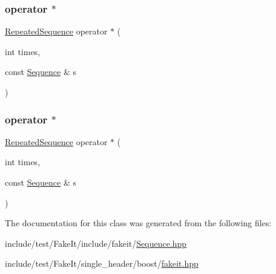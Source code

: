 \subsubsection{\texorpdfstring{operator $\ast$}{operator *}\hspace{0.1cm}{\footnotesize\ttfamily [17/18]}}
{\footnotesize\ttfamily \mbox{\hyperlink{classfakeit_1_1RepeatedSequence}{Repeated\+Sequence}} operator $\ast$ (\begin{DoxyParamCaption}\item[{int}]{times,  }\item[{const \mbox{\hyperlink{classfakeit_1_1Sequence}{Sequence}} \&}]{s }\end{DoxyParamCaption})\hspace{0.3cm}{\ttfamily [friend]}}

\mbox{\label{classfakeit_1_1RepeatedSequence_ae695b1e2c0f00bc6b9a49dd1efcb8f7b}} 
\subsubsection{\texorpdfstring{operator $\ast$}{operator *}\hspace{0.1cm}{\footnotesize\ttfamily [18/18]}}
{\footnotesize\ttfamily \mbox{\hyperlink{classfakeit_1_1RepeatedSequence}{Repeated\+Sequence}} operator $\ast$ (\begin{DoxyParamCaption}\item[{int}]{times,  }\item[{const \mbox{\hyperlink{classfakeit_1_1Sequence}{Sequence}} \&}]{s }\end{DoxyParamCaption})\hspace{0.3cm}{\ttfamily [friend]}}



The documentation for this class was generated from the following files\+:\begin{DoxyCompactItemize}
\item 
include/test/\+Fake\+It/include/fakeit/\mbox{\hyperlink{Sequence_8hpp}{Sequence.\+hpp}}\item 
include/test/\+Fake\+It/single\+\_\+header/boost/\mbox{\hyperlink{single__header_2boost_2fakeit_8hpp}{fakeit.\+hpp}}\end{DoxyCompactItemize}
